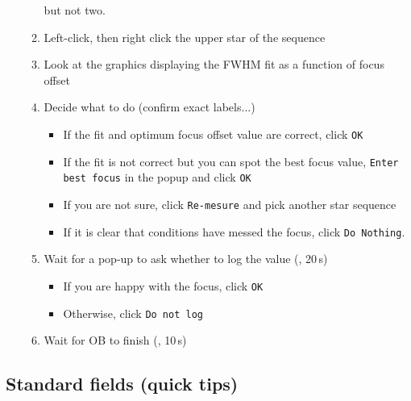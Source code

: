 \documentclass[11pt,fleqn,a4paper]{book}
\begin{document}
\begin{enumerate}
\begin{enumerate}
         but not two.
        \item Left-click, then right click the upper star of the sequence
        \item Look at the graphics displaying the FWHM fit as a function of
         focus offset
        \item Decide what to do (confirm exact labels...)
        \begin{itemize}
            \item If the fit and optimum focus offset value are correct, click \texttt{OK}
            \item If the fit is not correct but you can spot the best focus value, \texttt{Enter best focus} in the popup and click \texttt{OK} 
            \item If you are not sure, click \texttt{Re-mesure} and pick another star sequence
            \item If it is clear that conditions have messed the focus, click \texttt{Do Nothing}.
        \end{itemize}
        \item Wait for a pop-up to ask whether to log the value (, 20\,s)
        \begin{itemize}
            \item If you are happy with the focus, click \texttt{OK}
            \item Otherwise, click \texttt{Do not log}
        \end{itemize}
        \item Wait for OB to finish (, 10\,s) 
    \end{enumerate}
\end{enumerate}

\subsection{Standard fields (quick tips)}
\end{document}
